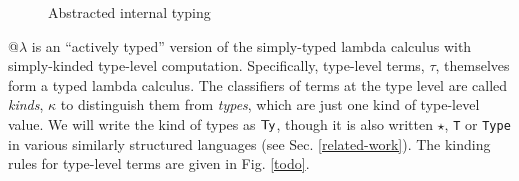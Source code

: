\documentclass[9pt,preprint]{sigplanconf}
\begin{document}
\begin{figure}[t]
\begin{mathpar}

%
%
%
%
%
%

\end{mathpar}
\caption{\small Abstracted internal typing}
\label{ait}
\end{figure}
@$\lambda$ is an ``actively typed'' version of the simply-typed lambda calculus with simply-kinded type-level computation. Specifically, type-level terms, $\tau$, themselves form a typed lambda calculus. The classifiers of terms at the type level are called \emph{kinds}, $\kappa$ to distinguish them from  \emph{types}, which are just one kind  of type-level value. We will write the kind of types as $\kTypeBlur$, though it is also written $\star$, \verb|T| or \verb|Type| in various similarly structured languages (see Sec. \ref{related-work}). The kinding rules for type-level terms are given in Fig. \ref{todo}.%
\end{document}
